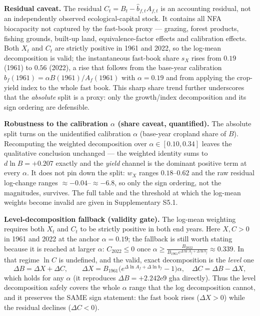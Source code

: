 \documentclass[11pt]{article}
\begin{document}
\textbf{Residual caveat.} The residual $C_t=B_t-\hat b_{f,t}A_{f,t}$ is an accounting residual, not an
independently observed ecological-capital stock. It contains all NFA biocapacity not captured by the fast-book
proxy --- grazing, forest products, fishing grounds, built-up land, equivalence-factor effects and calibration
effects. Both $X_t$ and $C_t$ are strictly positive in 1961 and 2022, so the log-mean decomposition is valid; the
instantaneous fast-book share $s_X$ rises from $0.19$ (1961) to $0.56$ (2022), a rise that follows from the
base-year calibration $b_f(1961)=\alpha B(1961)/A_f(1961)$ with $\alpha=0.19$ and from applying the crop-yield
index to the whole fast book. This sharp share trend further underscores that the \emph{absolute} split is a
proxy: only the growth/index decomposition and its sign ordering are defensible.

\medskip
\noindent\textbf{Robustness to the calibration $\alpha$ (share caveat, quantified).} The absolute split turns on
the unidentified calibration $\alpha$ (base-year cropland share of $B$). Recomputing the weighted decomposition
over $\alpha\in[0.10,0.34]$ leaves the qualitative conclusion unchanged --- the weighted identity sums to
$d\ln B=+0.207$ exactly and the \emph{yield} channel is the dominant positive term at every $\alpha$. It does
not pin down the split: $w_X$ ranges $0.18$--$0.62$ and the raw residual log-change ranges $\approx-0.04$--$\approx-6.8$,
so only the sign ordering, not the magnitudes, survives. The full table and the threshold at which the
log-mean weights become invalid are given in Supplementary S5.1.

\noindent\textbf{Level-decomposition fallback (validity gate).} The log-mean weighting requires both $X_t$ and
$C_t$ to be strictly positive in both end years. Here $X,C>0$ in 1961 and 2022 at the anchor $\alpha=0.19$; the
fallback is still worth stating because it is reached at larger $\alpha$: $C_{2022}\le0$ once $\alpha\ge
\frac{B_{2022}}{B_{1961}e^{\Delta\ln A_f+\Delta\ln b_f}}\approx0.339$. In that regime $\ln C$ is undefined, and
the valid, exact decomposition is the \emph{level} one
\[
\Delta B=\Delta X+\Delta C,\qquad \Delta X=B_{1961}\big(e^{\Delta\ln A_f+\Delta\ln b_f}-1\big)\alpha,\quad
\Delta C=\Delta B-\Delta X ,
\]
which holds for any $\alpha$ (it reproduces $\Delta B=+2.242\text{e}9$ gha directly). Thus the level decomposition
safely covers the whole $\alpha$ range that the log decomposition cannot, and it preserves the SAME sign
statement: the fast book rises ($\Delta X>0$) while the residual declines ($\Delta C<0$).
\end{document}
